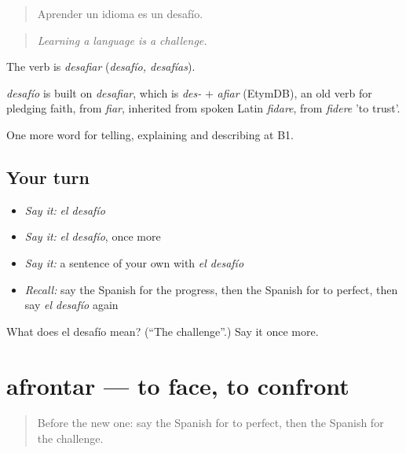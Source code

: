\begin{quote}
Aprender un idioma es un desafío.
\end{quote}

\begin{quote}
\emph{Learning a language is a challenge.}
\end{quote}

The verb is \emph{desafiar} (\emph{desafío, desafías}).

\begin{cousinweb}
\emph{desafío} is built on \emph{desafiar}, which is \emph{des-} + \emph{afiar} (EtymDB), an old verb for pledging faith, from \emph{fiar}, inherited from spoken Latin \emph{fidare}, from \emph{fidere} 'to trust'.
\end{cousinweb}

\begin{grammarlens}[title={What you've built}]
One more word for telling, explaining and describing at B1.
\end{grammarlens}

\subsection*{Your turn}
\begin{itemize}
\raggedright
  \item \emph{Say it:} \emph{el desafío}
  \item \emph{Say it:} \emph{el desafío}, once more
  \item \emph{Say it:} a sentence of your own with \emph{el desafío}
  \item \emph{Recall:} say the Spanish for the progress, then the Spanish for to perfect, then say \emph{el desafío} again
\end{itemize}

\begin{tcolorbox}[breakable,colback=teal!4,colframe=teal!35!black,title={Before you move on}]
What does el desafío mean? (\textquotedblleft{}The challenge\textquotedblright{}.) Say it once more.
\end{tcolorbox}
\section[afrontar]{afrontar — to face, to confront}

\label{lesson:ES-C609-afrontar}



\begin{quote}
Before the new one: say the Spanish for to perfect, then the Spanish for the challenge.
\end{quote}

